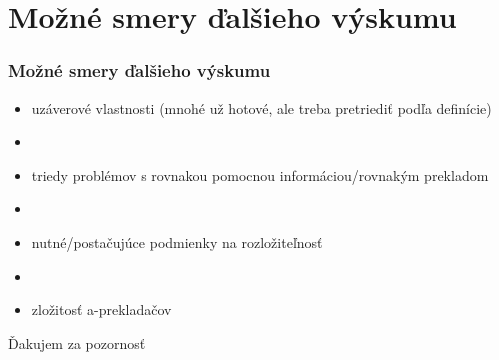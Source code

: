 \documentclass[slovak]{beamer}
\begin{document}
\section{Možné smery ďalšieho výskumu}
\begin{frame}
\frametitle{Možné smery ďalšieho výskumu}

\begin{itemize}
\item uzáverové vlastnosti (mnohé už hotové, ale treba pretriediť podľa definície)
\item[]
\item triedy problémov s rovnakou pomocnou informáciou/rovnakým prekladom
\item[]
\item nutné/postačujúce podmienky na rozložiteľnosť
\item[]
\item zložitosť a-prekladačov
\end{itemize}
\end{frame}


\begin{frame}
\Huge{\centerline{Ďakujem za pozornosť}}
\end{frame}
\end{document}

